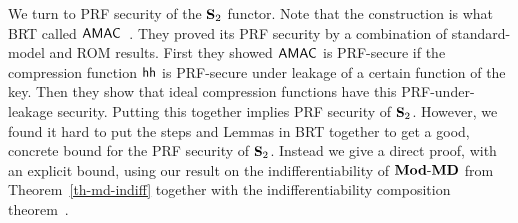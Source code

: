 
We turn to PRF security of the $\mathbf{S}_2$ functor. Note that the construction is what BRT called $\mathsf{AMAC}$~\cite{EC:BelBerTes16}. They proved its PRF security by a combination of standard-model and ROM results. First they showed $\mathsf{AMAC}$ is PRF-secure if the compression function $\mathsf{hh}$ is PRF-secure under leakage of a certain function of the key. Then they show that ideal compression functions have this PRF-under-leakage security. Putting this together implies PRF security of $\mathbf{S}_2$. However, we found it hard to put the steps and Lemmas in BRT together to get a good, concrete bound for the PRF security of $\mathbf{S}_2$. Instead we give a direct proof, with an explicit bound, using our result on the indifferentiability of $\mathbf{Mod\mbox{-}MD}$ from Theorem~\ref{th-md-indiff} together with the indifferentiability composition theorem~\cite{TCC:MauRenHol04}.


